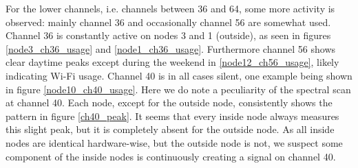 \documentclass[a4paper, 11pt]{article}
\begin{document}
For the lower channels, i.e. channels between 36 and 64, some more activity is observed: mainly channel 36 and occasionally channel 56 are somewhat used. Channel 36 is constantly active on nodes 3 and 1 (outside), as seen in figures \ref{node3_ch36_usage} and \ref{node1_ch36_usage}. Furthermore channel 56 shows clear daytime peaks except during the weekend in \ref{node12_ch56_usage}, likely indicating Wi-Fi usage. Channel 40 is in all cases silent, one example being shown in figure \ref{node10_ch40_usage}. Here we do note a peculiarity of the spectral scan at channel 40. Each node, except for the outside node, consistently shows the pattern in figure \ref{ch40_peak}. It seems that every inside node always measures this slight peak, but it is completely absent for the outside node. As all inside nodes are identical hardware-wise, but the outside node is not, we suspect some component of the inside nodes is continuously creating a signal on channel 40.
\end{document}
